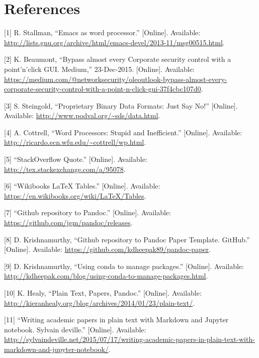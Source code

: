 \documentclass[journal,10pt,final]{IEEEtran}
\begin{document}
\section{References}\label{references}

\hypertarget{refs}{}
\hypertarget{ref-stallmanux5femacs}{}
{[}1{]} R. Stallman, ``Emacs as word processor.'' {[}Online{]}.
Available:
\url{http://lists.gnu.org/archive/html/emacs-devel/2013-11/msg00515.html}.

\hypertarget{ref-beaumontux5fbypassux5f2015}{}
{[}2{]} K. Beaumont, ``Bypass almost every Corporate security control
with a point'n'click GUI. Medium,'' 23-Dec-2015. {[}Online{]}.
Available:
\url{https://medium.com/@networksecurity/oleoutlook-bypass-almost-every-corporate-security-control-with-a-point-n-click-gui-37f4cbc107d0}.

\hypertarget{ref-steingoldux5fproprietary}{}
{[}3{]} S. Steingold, ``Proprietary Binary Data Formats: Just Say No!''
{[}Online{]}. Available: \url{http://www.podval.org/~sds/data.html}.

\hypertarget{ref-cottrellux5fword}{}
{[}4{]} A. Cottrell, ``Word Processors: Stupid and Inefficient.''
{[}Online{]}. Available:
\url{http://ricardo.ecn.wfu.edu/~cottrell/wp.html}.

\hypertarget{ref-ux5fstackoverflow}{}
{[}5{]} ``StackOverflow Quote.'' {[}Online{]}. Available:
\url{http://tex.stackexchange.com/a/95078}.

\hypertarget{ref-ux5fwikibooks}{}
{[}6{]} ``Wikibooks LaTeX Tables.'' {[}Online{]}. Available:
\url{https://en.wikibooks.org/wiki/LaTeX/Tables}.

\hypertarget{ref-ux5fgithub}{}
{[}7{]} ``Github repository to Pandoc.'' {[}Online{]}. Available:
\url{https://github.com/jgm/pandoc/releases}.

\hypertarget{ref-krishnamurthyux5fgithub}{}
{[}8{]} D. Krishnamurthy, ``Github repository to Pandoc Paper Template.
GitHub.'' {[}Online{]}. Available:
\url{https://github.com/kdheepak89/pandoc-paper}.

\hypertarget{ref-krishnamurthyux5fusing}{}
{[}9{]} D. Krishnamurthy, ``Using conda to manage packages.''
{[}Online{]}. Available:
\url{http://kdheepak.com/blog/using-conda-to-manage-packages.html}.

\hypertarget{ref-healyux5fplain}{}
{[}10{]} K. Healy, ``Plain Text, Papers, Pandoc.'' {[}Online{]}.
Available:
\url{http://kieranhealy.org/blog/archives/2014/01/23/plain-text/}.

\hypertarget{ref-ux5fwriting}{}
{[}11{]} ``Writing academic papers in plain text with Markdown and
Jupyter notebook. Sylvain deville.'' {[}Online{]}. Available:
\url{http://sylvaindeville.net/2015/07/17/writing-academic-papers-in-plain-text-with-markdown-and-jupyter-notebook/}.
\end{document}
